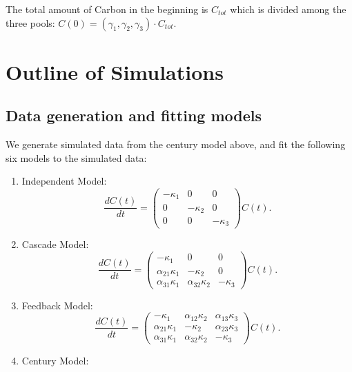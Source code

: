 \documentclass[10pt,a4paper]{article}
\begin{document}
The total amount of Carbon in the beginning is $C_{tot}$ which is divided among the three pools: $C(0) = (\gamma_1, \gamma_2, \gamma_3) \cdot C_{tot}$. 


\section{Outline of Simulations}

\subsection{Data generation and fitting models}
We generate simulated data from the century model above, and fit the following six models to the simulated data:

\begin{enumerate}
\item Independent Model:  
\begin{equation*}
\frac{dC(t)}{dt} = 
   \left( {\begin{array}{ccc}
   -\kappa_1 & 0 & 0 \\
    0 & -\kappa_2& 0  \\
    0 & 0 & -\kappa_3    
   \end{array} } \right) C(t).
\end{equation*}
\item Cascade Model:
\begin{equation*}
\frac{dC(t)}{dt} = 
   \left( {\begin{array}{ccc}
   -\kappa_1 & 0 & 0 \\
    \alpha_{21}\kappa_1 & -\kappa_2& 0  \\
    \alpha_{31} \kappa_1 & \alpha_{32} \kappa_2 & -\kappa_3    
   \end{array} } \right) C(t).
\end{equation*}
\item Feedback Model:
\begin{equation*}
\frac{dC(t)}{dt} = 
   \left( {\begin{array}{ccc}
   -\kappa_1 & \alpha_{12} \kappa_2 & \alpha_{13}\kappa_3 \\
    \alpha_{21}\kappa_1 & -\kappa_2& \alpha_{23} \kappa_3 \\
    \alpha_{31} \kappa_1 & \alpha_{32} \kappa_2 & -\kappa_3    
   \end{array} } \right) C(t).
\end{equation*}
\item Century Model:
\begin{equation*}

\end{equation*}
\end{enumerate}
\end{document}
